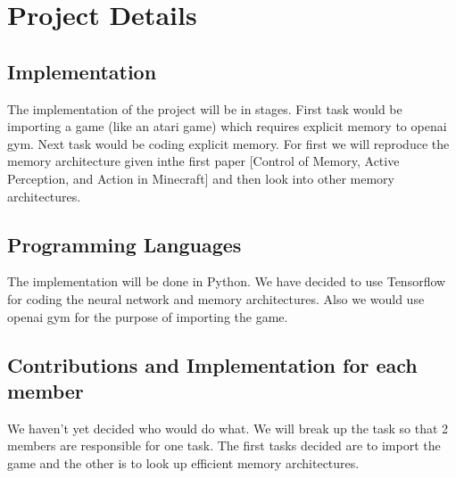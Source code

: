 \documentclass{article}
\begin{document}
\section{Project Details}
\subsection{Implementation}
The implementation of the project will be in stages. First task would be importing a game (like an atari game) which requires explicit memory to openai gym. Next task would be coding explicit memory. For first we will reproduce the memory architecture given inthe first paper [Control of Memory, Active Perception, and Action in Minecraft] and then look into other memory architectures.

\subsection{Programming Languages}
The implementation will be done in Python. We have decided to use Tensorflow for coding the neural network and memory architectures. Also we would use openai gym for the purpose of importing the game.

\subsection{Contributions and Implementation for each member}
We haven't yet decided who would do what. We will break up the task so that 2 members are responsible for one task. The first tasks decided are to import the game and the other is to look up efficient memory architectures.
\end{document}
